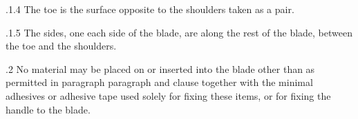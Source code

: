 \documentclass[12pt]{article}
\begin{document}
\vspace{\baselineskip}
\begin{adjustwidth}{0.49in}{0.0in}
{\fontsize{9pt}{10.8pt}.1.4 \tabto{1.17in} The toe is the surface opposite to the shoulders taken as a pair.\par}\par

\end{adjustwidth}


\vspace{\baselineskip}
\begin{adjustwidth}{1.18in}{0.1in}
{\fontsize{9pt}{10.8pt}.1.5 \tabto{1.17in} The sides, one each side of the blade, are along the rest of the blade, between the toe and the shoulders.\par}\par

\end{adjustwidth}


\vspace{\baselineskip}

\vspace{\baselineskip}

\vspace{\baselineskip}

\vspace{\baselineskip}

\vspace{\baselineskip}

\vspace{\baselineskip}
\begin{Center}
{\fontsize{8pt}{9.6pt}\par}
\end{Center}\par


\vspace{\baselineskip}

\vspace{\baselineskip}
\begin{adjustwidth}{0.5in}{0.1in}
{\fontsize{9pt}{10.8pt}.2 \tabto{0.49in} No material may be placed on or inserted into the blade other than as permitted in paragraph  paragraph and clause together with the minimal adhesives or adhesive tape used solely for fixing these items, or for fixing the handle to the blade.\par}\par

\end{adjustwidth}
\end{document}
